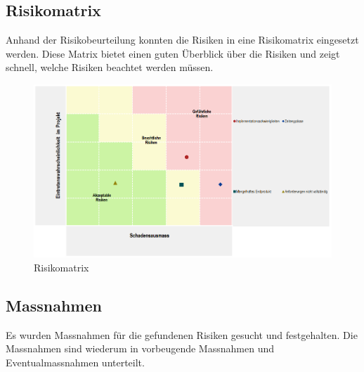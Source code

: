\subsection{Risikomatrix}
Anhand der Risikobeurteilung konnten die Risiken in eine Risikomatrix eingesetzt werden. Diese Matrix bietet einen guten Überblick über die Risiken und zeigt schnell, welche Risiken beachtet werden müssen.
\begin{figure}[h]
\centering
\includegraphics[scale=0.5]{images/excel/risikomatrix.png}
\caption{Risikomatrix}
\label{fig:risikomatrix}
\end{figure}

\subsection{Massnahmen}
Es wurden Massnahmen für die gefundenen Risiken gesucht und festgehalten. Die Massnahmen sind wiederum in vorbeugende Massnahmen und Eventualmassnahmen unterteilt.

